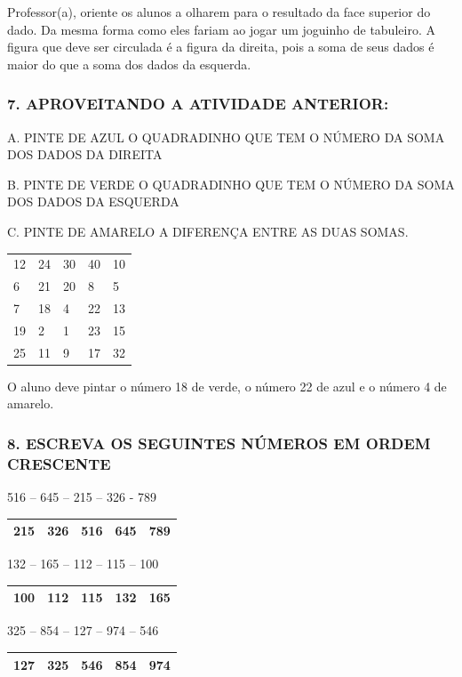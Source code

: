 Professor(a), oriente os alunos a olharem para o resultado da face
superior do dado. Da mesma forma como eles fariam ao jogar um joguinho
de tabuleiro. A figura que deve ser circulada é a figura da direita,
pois a soma de seus dados é maior do que a soma dos dados da esquerda.

\subsubsection{7. APROVEITANDO A ATIVIDADE
ANTERIOR:}\label{aproveitando-a-atividade-anterior}

A. PINTE DE AZUL O QUADRADINHO QUE TEM O NÚMERO DA SOMA DOS DADOS DA
DIREITA

B. PINTE DE VERDE O QUADRADINHO QUE TEM O NÚMERO DA SOMA DOS DADOS DA
ESQUERDA

C. PINTE DE AMARELO A DIFERENÇA ENTRE AS DUAS SOMAS.

\begin{longtable}[]{@{}lllll@{}}
\toprule
12 & 24 & 30 & 40 & 10\tabularnewline
6 & 21 & 20 & 8 & 5\tabularnewline
7 & 18 & 4 & 22 & 13\tabularnewline
19 & 2 & 1 & 23 & 15\tabularnewline
25 & 11 & 9 & 17 & 32\tabularnewline
\bottomrule
\end{longtable}

O aluno deve pintar o número 18 de verde, o número 22 de azul e o número
4 de amarelo.

\subsubsection{8. ESCREVA OS SEGUINTES NÚMEROS EM ORDEM
CRESCENTE}\label{escreva-os-seguintes-nuxfameros-em-ordem-crescente}

516 -- 645 -- 215 -- 326 - 789

\begin{longtable}[]{@{}lllll@{}}
\toprule
215 & 326 & 516 & 645 & 789\tabularnewline
\bottomrule
\end{longtable}

132 -- 165 -- 112 -- 115 -- 100

\begin{longtable}[]{@{}lllll@{}}
\toprule
100 & 112 & 115 & 132 & 165\tabularnewline
\bottomrule
\end{longtable}

325 -- 854 -- 127 -- 974 -- 546

\begin{longtable}[]{@{}lllll@{}}
\toprule
127 & 325 & 546 & 854 & 974\tabularnewline
\bottomrule
\end{longtable}

